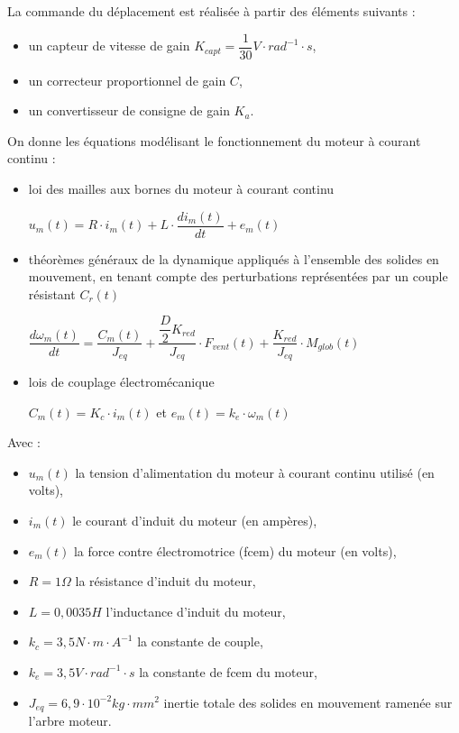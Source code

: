 La commande du déplacement est réalisée à partir des éléments suivants :
\begin{itemize}
 \item un capteur de vitesse de gain $K_{capt}=\dfrac{1}{30} V\cdot rad^{-1}\cdot s$,
 \item un correcteur proportionnel de gain $C$,
 \item un convertisseur de consigne de gain $K_a$.
\end{itemize}

On donne les équations modélisant le fonctionnement du moteur à courant continu :
\begin{itemize}
 \item loi des mailles aux bornes du moteur à courant continu

$u_m(t)=R\cdot i_m(t)+L\cdot\dfrac{di_m(t)}{dt}+e_m(t)$

 \item théorèmes généraux de la dynamique appliqués à l'ensemble des solides en mouvement, en tenant compte des perturbations représentées par un couple résistant $C_r(t)$
 
$\dfrac{d\omega_m(t)}{dt}=\dfrac{C_m(t)}{J_{eq}}+\dfrac{\dfrac{D}{2}K_{red}}{J_{eq}}\cdot F_{vent}(t)+\dfrac{K_{red}}{J_{eq}}\cdot M_{glob}(t)$

 \item lois de couplage électromécanique

$C_m(t)=K_c\cdot i_m(t)$ et $e_m(t)=k_e\cdot \omega_m(t)$
\end{itemize}

Avec :
\begin{itemize}
 \item $u_m(t)$ la tension d'alimentation du moteur à courant continu utilisé (en volts),
 \item $i_m(t)$ le courant d'induit du moteur (en ampères),
 \item $e_m(t)$ la force contre électromotrice (fcem) du moteur (en volts),
 \item $R=1\Omega$ la résistance d'induit du moteur,
 \item $L=0,0035H$ l'inductance d'induit du moteur,
 \item $k_c=3,5N\cdot m\cdot A^{-1}$ la constante de couple,
 \item $k_e=3,5V\cdot rad^{-1}\cdot s$ la constante de fcem du moteur,
 \item $J_{eq}=6,9\cdot 10^{-2}kg\cdot mm^2$ inertie totale des solides en mouvement ramenée sur l'arbre moteur.
\end{itemize}

